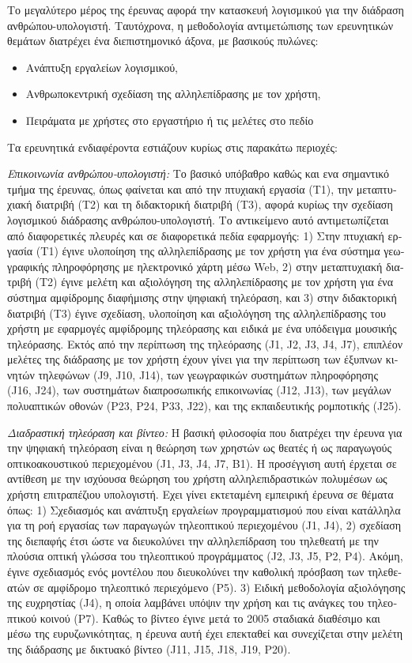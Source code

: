 \documentclass[11pt, a4paper]{article}
\begin{document}
\begin{greek}
Το μεγαλύτερο μέρος της έρευνας αφορά την κατασκευή λογισμικού για την
διάδραση ανθρώπου-υπολογιστή. Ταυτόχρονα, η μεθοδολογία αντιμετώπισης
των ερευνητικών θεμάτων διατρέχει ένα διεπιστημονικό άξονα, με βασικούς
πυλώνες:

\begin{itemize}
\item
  Ανάπτυξη εργαλείων λογισμικού,
\item
  Ανθρωποκεντρική σχεδίαση της αλληλεπίδρασης με τον χρήστη,
\item
  Πειράματα με χρήστες στο εργαστήριο ή τις μελέτες στο πεδίο
\end{itemize}

Τα ερευνητικά ενδιαφέροντα εστιάζουν κυρίως στις παρακάτω περιοχές:

\emph{Επικοινωνία ανθρώπου-υπολογιστή:} Το βασικό υπόβαθρο καθώς και ενα
σημαντικό τμήμα της έρευνας, όπως φαίνεται και από την πτυχιακή εργασία
(Τ1), την μεταπτυχιακή διατριβή (Τ2) και τη διδακτορική διατριβή (Τ3),
αφορά κυρίως την σχεδίαση λογισμικού διάδρασης ανθρώπου-υπολογιστή. Το
αντικείμενο αυτό αντιμετωπίζεται από διαφορετικές πλευρές και σε
διαφορετικά πεδία εφαρμογής: 1) Στην πτυχιακή εργασία (Τ1) έγινε
υλοποίηση της αλληλεπίδρασης με τον χρήστη για ένα σύστημα γεωγραφικής
πληροφόρησης με ηλεκτρονικό χάρτη μέσω Web, 2) στην μεταπτυχιακή
διατριβή (Τ2) έγινε μελέτη και αξιολόγηση της αλληλεπίδρασης με τον
χρήστη για ένα σύστημα αμφίδρομης διαφήμισης στην ψηφιακή τηλεόραση, και
3) στην διδακτορική διατριβή (Τ3) έγινε σχεδίαση, υλοποίηση και
αξιολόγηση της αλληλεπίδρασης του χρήστη με εφαρμογές αμφίδρομης
τηλεόρασης και ειδικά με ένα υπόδειγμα μουσικής τηλεόρασης. Εκτός από
την περίπτωση της τηλεόρασης (J1, J2, J3, J4, J7), επιπλέον μελέτες της
διάδρασης με τον χρήστη έχουν γίνει για την περίπτωση των έξυπνων
κινητών τηλεφώνων (J9, J10, J14), των γεωγραφικών συστημάτων
πληροφόρησης (J16, J24), των συστημάτων διαπροσωπικής επικοινωνίας (J12,
J13), των μεγάλων πολυαπτικών οθονών (P23, P24, P33, J22), και της
εκπαιδευτικής ρομποτικής (J25).

\emph{Διαδραστική τηλεόραση και βίντεο:} Η βασική φιλοσοφία που
διατρέχει την έρευνα για την ψηφιακή τηλεόραση είναι η θεώρηση των
χρηστών ως θεατές ή ως παραγωγούς οπτικοακουστικού περιεχομένου (J1, J3,
J4, J7, B1). Η προσέγγιση αυτή έρχεται σε αντίθεση με την ισχύουσα
θεώρηση του χρήστη αλληλεπιδραστικών πολυμέσων ως χρήστη επιτραπέζιου
υπολογιστή. Εχει γίνει εκτεταμένη εμπειρική έρευνα σε θέματα όπως: 1)
Σχεδιασμός και ανάπτυξη εργαλείων προγραμματισμού που είναι κατάλληλα
για τη ροή εργασίας των παραγωγών τηλεοπτικού περιεχομένου (J1, J4), 2)
σχεδίαση της διεπαφής έτσι ώστε να διευκολύνει την αλληλεπίδραση του
τηλεθεατή με την πλούσια οπτική γλώσσα του τηλεοπτικού προγράμματος (J2,
J3, J5, P2, P4). Ακόμη, έγινε σχεδιασμός ενός μοντέλου που διευκολύνει
την καθολική πρόσβαση των τηλεθεατών σε αμφίδρομο τηλεοπτικό περιεχόμενο
(P5). 3) Ειδική μεθοδολογία αξιολόγησης της ευχρηστίας (J4), η οποία
λαμβάνει υπόψιν την χρήση και τις ανάγκες του τηλεοπτικού κοινού (P7).
Καθώς το βίντεο έγινε μετά το 2005 σταδιακά διαθέσιμο και μέσω της
ευρυζωνικότητας, η έρευνα αυτή έχει επεκταθεί και συνεχίζεται στην
μελέτη της διάδρασης με δικτυακό βίντεο (J11, J15, J18, J19, P20).


\end{greek}
\end{document}
